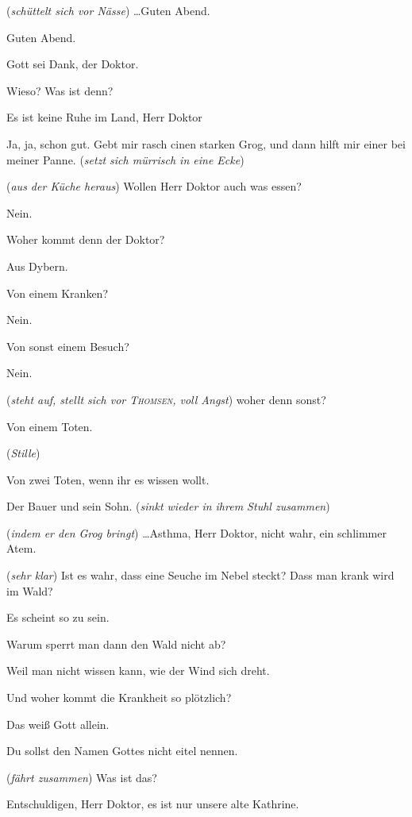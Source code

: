 \documentclass[
	final,
	a4paper,
	ngerman,
	mpinclude = true, %
	twoside = true,
	open = right,
	cleardoublepage = plain,
	DIV = 13,
	BCOR = 1cm,
	titlepage = firstiscover,
	]{scrbook}
\newcommand{\direction}[1]{(\textit{#1})}
\newcommand{\thecharacter}[1]{\textup{\textsc{#1}}\xspace}
\newcommand{\theBarbara}{\thecharacter{Barbara}}
\newcommand{\theJosef}{\thecharacter{Josef}}
\newcommand{\theKathrine}{\thecharacter{Kathrine}}
\newcommand{\theGregor}{\thecharacter{Gregor}}
\newcommand{\theLuise}{\thecharacter{Luise}}
\newcommand{\theThomsen}{\thecharacter{Thomsen}}
\newcommand{\character}[1]{\item[#1]}
\newcommand{\Barbara}{\character{\theBarbara}}
\newcommand{\Josef}{\character{\theJosef}}
\newcommand{\Kathrine}{\character{\theKathrine}}
\newcommand{\Gregor}{\character{\theGregor}}
\newcommand{\Luise}{\character{\theLuise}}
\newcommand{\Thomsen}{\character{\theThomsen}}
\begin{document}
\begin{play}
\Thomsen
\direction{schüttelt sich vor Nässe} \ldots Guten Abend.

\Gregor
Guten Abend.

\Luise
Gott sei Dank, der Doktor.

\Thomsen
Wieso? Was ist denn?

\Josef
Es ist keine Ruhe im Land, Herr Doktor

\Thomsen
Ja, ja, schon gut. Gebt mir rasch cinen starken Grog, und dann hilft mir einer bei meiner Panne. \direction{setzt sich mürrisch in eine Ecke}

\Josef
\direction{aus der Küche heraus} Wollen Herr Doktor auch was essen?

\Thomsen
Nein.

\Barbara
Woher kommt denn der Doktor?

\Thomsen
Aus Dybern.

\Luise
Von einem Kranken?

\Thomsen
Nein.

\Gregor
Von sonst einem Besuch?

\Thomsen
Nein.

\Barbara
\direction{steht auf, stellt sich vor \theThomsen, voll Angst} woher denn sonst?

\Thomsen
Von einem Toten.

\direction{Stille}

\Thomsen
Von zwei Toten, wenn ihr es wissen wollt.

\Barbara
Der Bauer und sein Sohn. \direction{sinkt wieder in ihrem Stuhl zusammen}

\Josef
\direction{indem er den Grog bringt} \ldots Asthma, Herr Doktor, nicht wahr, ein schlimmer Atem.

\Luise
\direction{sehr klar} Ist es wahr, dass eine Seuche im Nebel steckt? Dass man krank wird im Wald?

\Thomsen
Es scheint so zu sein.

\Luise
Warum sperrt man dann den Wald nicht ab?

\Thomsen
Weil man nicht wissen kann, wie der Wind sich dreht.

\Gregor
Und woher kommt die Krankheit so plötzlich?

\Thomsen
Das weiß Gott allein.

\Kathrine
Du sollst den Namen Gottes nicht eitel nennen.

\Thomsen
\direction{fährt zusammen} Was ist das?

\Josef
Entschuldigen, Herr Doktor, es ist nur unsere alte Kathrine.


\end{play}
\end{document}
